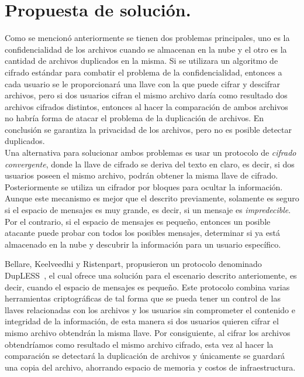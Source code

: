 
\section{Propuesta de solución. }

Como se mencionó anteriormente se tienen dos problemas principales, uno es la confidencialidad de los archivos cuando se almacenan en la nube y el otro es la cantidad de archivos duplicados en la misma. Si se utilizara un algoritmo de cifrado est\'andar para combatir el problema de la confidencialidad, entonces a cada usuario se le proporcionará una llave con la que puede cifrar y descifrar archivos, pero si dos usuarios cifran el mismo archivo daría como resultado dos archivos cifrados distintos, entonces al hacer la comparación de ambos archivos no habría forma de atacar el problema de la duplicación de archivos. En conclusi\'on se garantiza la privacidad de los archivos, pero no es posible detectar duplicados.\\

Una alternativa para solucionar ambos problemas es usar un protocolo de {\it cifrado convergente}, donde la llave de cifrado se deriva del texto en claro, es decir, si dos usuarios poseen el mismo archivo, podr\'an obtener la misma llave de cifrado. Posteriormente se utiliza un cifrador por bloques para ocultar la informaci\'on. Aunque este mecanismo es mejor que el descrito previamente, solamente es seguro si el espacio de mensajes es muy grande, es decir, si un mensaje es {\it impredecible}. Por el contrario, si el espacio de mensajes es peque\~no, entonces un posible atacante puede probar con todos los posibles mensajes, determinar si ya est\'a almacenado en la nube y descubrir la 
informaci\'on para un usuario espec\'ifico. 

Bellare, Keelveedhi y Ristenpart, propusieron un protocolo denominado DupLESS~\cite{dupless}, el cual ofrece una soluci\'on para el escenario descrito anteriomente, es decir, cuando el espacio de mensajes es peque\~no. Este protocolo combina varias herramientas criptográficas de tal forma que se pueda tener un control de las llaves relacionadas con los archivos y los usuarios sin comprometer el contenido e integridad de la información, de esta manera si dos usuarios quieren cifrar el mismo archivo obtendrán la misma llave. Por consiguiente, al cifrar los archivos obtendríamos como resultado el mismo archivo cifrado, esta vez al hacer la comparación se detectará la duplicación de archivos y únicamente se guardará una copia del archivo, ahorrando espacio de memoria y costos de infraestructura. \\

